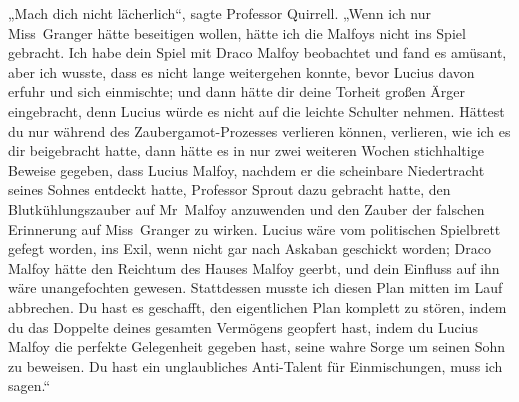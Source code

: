 „Mach dich nicht lächerlich“, sagte Professor Quirrell. „Wenn ich nur Miss~Granger hätte beseitigen wollen, hätte ich die Malfoys nicht ins Spiel gebracht. Ich habe dein Spiel mit Draco Malfoy beobachtet und fand es amüsant, aber ich wusste, dass es nicht lange weitergehen konnte, bevor Lucius davon erfuhr und sich einmischte; und dann hätte dir deine Torheit großen Ärger eingebracht, denn Lucius würde es nicht auf die leichte Schulter nehmen. Hättest du nur während des Zaubergamot-Prozesses verlieren können, verlieren, wie ich es dir beigebracht hatte, dann hätte es in nur zwei weiteren Wochen stichhaltige Beweise gegeben, dass Lucius Malfoy, nachdem er die scheinbare Niedertracht seines Sohnes entdeckt hatte, Professor Sprout dazu gebracht hatte, den Blutkühlungszauber auf Mr~Malfoy anzuwenden und den Zauber der falschen Erinnerung auf Miss~Granger zu wirken. Lucius wäre vom politischen Spielbrett gefegt worden, ins Exil, wenn nicht gar nach Askaban geschickt worden; Draco Malfoy hätte den Reichtum des Hauses Malfoy geerbt, und dein Einfluss auf ihn wäre unangefochten gewesen. Stattdessen musste ich diesen Plan mitten im Lauf abbrechen. Du hast es geschafft, den eigentlichen Plan komplett zu stören, indem du das Doppelte deines gesamten Vermögens geopfert hast, indem du Lucius Malfoy die perfekte Gelegenheit gegeben hast, seine wahre Sorge um seinen Sohn zu beweisen. Du hast ein unglaubliches Anti-Talent für Einmischungen, muss ich sagen.“


